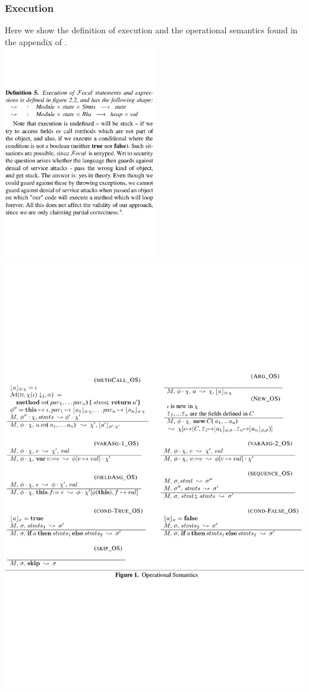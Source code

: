\documentclass[a4paper,11pt,twoside]{article}
\begin{document}
{\subsubsection{Execution}\label{app:execution}
Here we show the definition of execution and the operational semantics found in the appendix of \cite{drossopoulou2015b}.\\
\includegraphics[trim={0 5cm 0 5cm},width=0.5\textwidth]{figures/app_execution.pdf}\linebreak
\includegraphics[trim={0 0 0 0cm},width=\textwidth]{figures/app_op.pdf}
\clearpage

}
\end{document}
